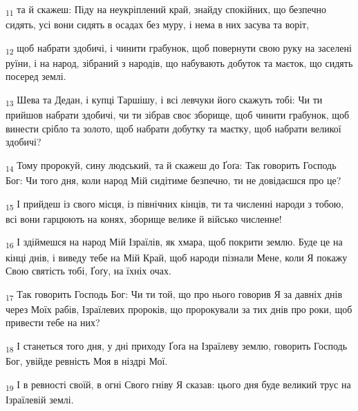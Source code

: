 \begin{tcolorbox}
\textsubscript{11} та й скажеш: Піду на неукріплений край, знайду спокійних, що безпечно сидять, усі вони сидять в осадах без муру, і нема в них засува та воріт,
\end{tcolorbox}
\begin{tcolorbox}
\textsubscript{12} щоб набрати здобичі, і чинити грабунок, щоб повернути свою руку на заселені руїни, і на народ, зібраний з народів, що набувають добуток та маєток, що сидять посеред землі.
\end{tcolorbox}
\begin{tcolorbox}
\textsubscript{13} Шева та Дедан, і купці Таршішу, і всі левчуки його скажуть тобі: Чи ти прийшов набрати здобичі, чи ти зібрав своє зборище, щоб чинити грабунок, щоб винести срібло та золото, щоб набрати добутку та маєтку, щоб набрати великої здобичі?
\end{tcolorbox}
\begin{tcolorbox}
\textsubscript{14} Тому пророкуй, сину людський, та й скажеш до Ґоґа: Так говорить Господь Бог: Чи того дня, коли народ Мій сидітиме безпечно, ти не довідаєшся про це?
\end{tcolorbox}
\begin{tcolorbox}
\textsubscript{15} І прийдеш із свого місця, із північних кінців, ти та численні народи з тобою, всі вони гарцюють на конях, зборище велике й військо численне!
\end{tcolorbox}
\begin{tcolorbox}
\textsubscript{16} І здіймешся на народ Мій Ізраїлів, як хмара, щоб покрити землю. Буде це на кінці днів, і виведу тебе на Мій Край, щоб народи пізнали Мене, коли Я покажу Свою святість тобі, Ґоґу, на їхніх очах.
\end{tcolorbox}
\begin{tcolorbox}
\textsubscript{17} Так говорить Господь Бог: Чи ти той, що про нього говорив Я за давніх днів через Моїх рабів, Ізраїлевих пророків, що пророкували за тих днів про роки, щоб привести тебе на них?
\end{tcolorbox}
\begin{tcolorbox}
\textsubscript{18} І станеться того дня, у дні приходу Ґоґа на Ізраїлеву землю, говорить Господь Бог, увійде ревність Моя в ніздрі Мої.
\end{tcolorbox}
\begin{tcolorbox}
\textsubscript{19} І в ревності своїй, в огні Свого гніву Я сказав: цього дня буде великий трус на Ізраїлевій землі.
\end{tcolorbox}
